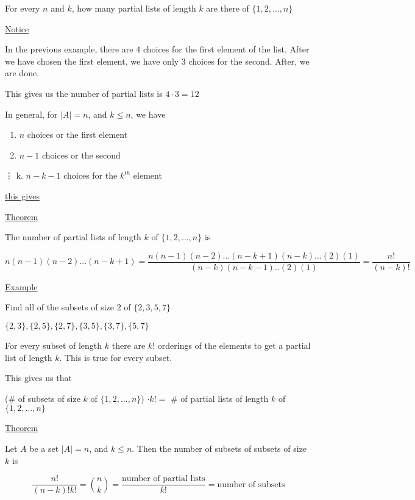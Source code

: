 \documentclass{article}
\begin{document}
For every $n$ and $k$, how many partial lists of length $k$ are there of $\{1,2,\ldots,n\}$

\underline{Notice}

In the previous example, there are $4$ choices for the first element of the list. After we have chosen the first element, we have only 3 choices for the second. After, we are done. 

This gives us the number of partial lists is $4 \cdot 3 = 12$

In general, for $|A| = n$, and $k \le n$, we have

\begin{enumerate}
    \item $n$ choices or the first element
    \item $n-1$ choices or the second
\end{enumerate}

\vdots
k. $n-k-1$ choices for the $k^{th}$ element

\underline{this gives}

\underline{Theorem}

The number of partial lists of length $k$ of $\{1,2,\ldots,n\}$ is 

\begin{equation*}
n(n-1)(n-2)...(n-k+1)
= \frac{n(n-1)(n-2)...(n-k+1)(n-k)...(2)(1)}{(n-k)(n-k-1)..(2)(1)}
= \frac{n!}{(n-k)!}
\end{equation*}

\underline{Example}

Find all of the subsets of size $2$ of $\{2,3,5,7\}$ 

$\{2,3\},\{2,5\},\{2,7\},\{3,5\},\{3,7\},\{5,7\}$

For every subset of length $k$ there are $k!$ orderings of the elements to get a partial list of length $k$. This is true for every subset.

This gives us that 

(\# of subsets of size $k$ of $\{1,2,\ldots,n\}$) $ \cdot k! =$ \# of partial lists of length $k$ of $\{1,2,\ldots,n\}$

\underline{Theorem}

Let $A$ be a set $|A| = n$, and $k \le n$. Then the number of subsets of subsets of size $k$ is

\begin{equation*}
\frac{n!}{(n-k)!k!} = \binom{n}{k}
=\frac{\text{number of partial lists}}{k!}
=\text{number of subsets}
\end{equation*}
\end{document}
